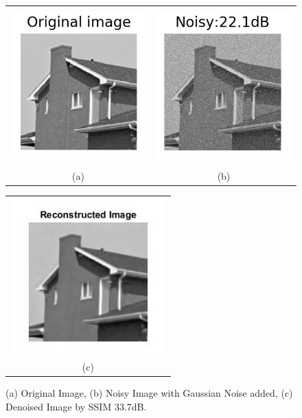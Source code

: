 \documentclass[a4paper, 15pt]{article}
\begin{document}
	\begin{figure}[!h]
		\centering 
		\begin{tabular}{cc}
			\includegraphics[width=6cm, height=6cm]{Original_KSVD.JPG} &\hspace{-8pt}
			\includegraphics[width=6cm, height=6cm]{Noisy_22_1dB_KSVD.JPG}\\
			(a) & (b) \\
		\end{tabular}
		\begin{tabular}{c}
			\includegraphics[width=6cm, height=6cm]{SSIM_rec.JPG}\\ 
			(c)
		\end{tabular}
		\caption{(a) Original Image, (b) Noisy Image with Gaussian Noise added, (c) Denoised Image by SSIM 33.7dB.}
	\end{figure}
\end{document}
